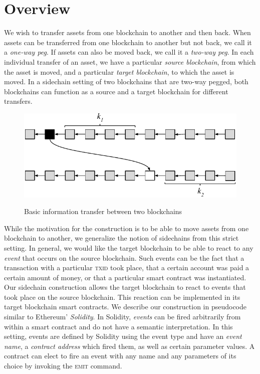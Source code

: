 \section{Overview}


We wish to transfer assets from one blockchain to another and then back. When
assets can be transferred from one blockchain to another but not back, we call
it a \emph{one-way peg}. If assets can also be moved back, we call it a
\emph{two-way peg}. In each individual transfer of an asset, we have a
particular \emph{source blockchain}, from which the asset is moved, and a
particular \emph{target blockchain}, to which the asset is moved. In a sidechain
setting of two blockchains that are two-way pegged, both blockchains can
function as a source and a target blockchain for different transfers.

\begin{figure}[H]
    \vspace{-2em}
    \caption{Basic information transfer between two blockchains}
    \centering
    \includegraphics[width=0.7 \columnwidth,keepaspectratio]{chapters/sidechains/figures/events.pdf}
    \label{fig.events}
    \vspace{-2em}
\end{figure}

While the motivation for the construction is to be able to move assets from one
blockchain to another, we generalize the notion of sidechains from this strict
setting. In general, we would like the target blockchain to be able to react to
any \emph{event} that occurs on the source blockchain. Such events can be the
fact that a transaction with a particular \textsc{txid} took place, that a
certain account was paid a certain amount of money, or that a particular smart
contract was instantiated. Our sidechain construction allows the target
blockchain to react to events that took place on the source blockchain. This
reaction can be implemented in its target blockchain smart contracts. We
describe our construction in pseudocode similar to Ethereum' \emph{Solidity}. In
Solidity, \emph{events} can be fired arbitrarily from within a smart contract
and do not have a semantic interpretation. In this setting, events are defined
by Solidity using the \textsf{event} type and have an \emph{event name}, a
\emph{contract address} which fired them, as well as certain parameter values. A
contract can elect to fire an event with any name and any parameters of its
choice by invoking the \textsc{emit} command.

